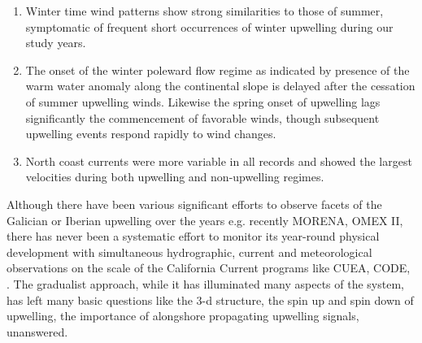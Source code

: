 \begin{enumerate}
  \item   Winter time wind patterns show strong similarities to those of
summer, symptomatic of frequent short occurrences of winter
upwelling during our study years.

  \item   The onset of the winter poleward flow regime as indicated by
presence of the warm water anomaly along the continental slope is
delayed after the cessation of summer upwelling winds.  Likewise
the spring onset of upwelling lags significantly the commencement
of favorable winds, though subsequent upwelling events respond
rapidly to wind changes.

  \item   North coast currents were more variable in all records
  and showed the largest velocities during both upwelling and
  non-upwelling regimes.
\end{enumerate}


Although there have been various significant efforts to observe
facets of the Galician or Iberian upwelling over the years e.g.
recently MORENA, OMEX II, there has never been a systematic effort
to monitor its year-round physical development with simultaneous
hydrographic, current and meteorological observations on the scale
of the California Current programs like CUEA, CODE, . The
gradualist approach, while it has illuminated many aspects of the
system, has left many basic questions like the 3-d structure, the
spin up and spin down of upwelling, the importance of alongshore
propagating upwelling signals, unanswered.
